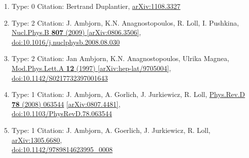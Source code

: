 \documentclass[a4paper,10pt]{article}
\begin{document}
\begin{enumerate}
\begin{enumerate}
  \item Type: 0 Citation: Bertrand Duplantier, \href{https://arxiv.org/abs/1108.3327}{arXiv:1108.3327}
  \item Type: 2 Citation: J. Ambjorn, K.N. Anagnostopoulos, R. Loll, I. Pushkina, \href{https://www.doi.org/10.1016/j.nuclphysb.2008.08.030}{Nucl.Phys.B {\bf 807} (2009) }  \href{https://arxiv.org/abs/0806.3506}{[arXiv:0806.3506]},\\\href{https://www.doi.org/10.1016/j.nuclphysb.2008.08.030}{doi:10.1016/j.nuclphysb.2008.08.030}
  \item Type: 2 Citation: Jan Ambjorn, K.N. Anagnostopoulos, Ulrika Magnea, \href{https://www.doi.org/10.1142/S0217732397001643}{Mod.Phys.Lett.A {\bf 12} (1997) }  \href{https://arxiv.org/abs/hep-lat/9705004}{[arXiv:hep-lat/9705004]},\\\href{https://www.doi.org/10.1142/S0217732397001643}{doi:10.1142/S0217732397001643}
  \item Type: 1 Citation: J. Ambjorn, A. Gorlich, J. Jurkiewicz, R. Loll, \href{https://www.doi.org/10.1103/PhysRevD.78.063544}{Phys.Rev.D {\bf 78} (2008) 063544}  \href{https://arxiv.org/abs/0807.4481}{[arXiv:0807.4481]},\\\href{https://www.doi.org/10.1103/PhysRevD.78.063544}{doi:10.1103/PhysRevD.78.063544}
  \item Type: 1 Citation: J. Ambjorn, A. Goerlich, J. Jurkiewicz, R. Loll, \href{https://arxiv.org/abs/1305.6680}{arXiv:1305.6680},\\\href{https://www.doi.org/10.1142/9789814623995_0008}{doi:10.1142/9789814623995\_0008}

\end{enumerate}
\end{enumerate}
\end{document}
